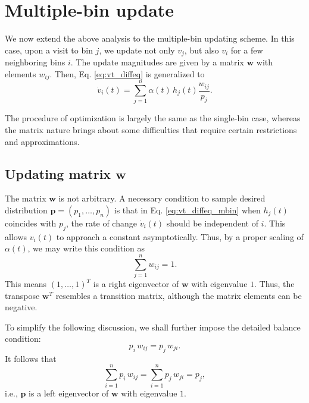 \documentclass[reprint]{revtex4-1}
\begin{document}
\section{\label{sec:multiple-bin}
Multiple-bin update}



We now extend the above analysis to
the multiple-bin updating scheme.
%
In this case,
upon a visit to bin $j$,
we update not only $v_j$,
but also $v_i$ for a few neighboring bins $i$.
%
The update magnitudes are given by a matrix $\mathbf w$
with elements $w_{ij}$.
%
Then, Eq. \eqref{eq:vt_diffeq} is generalized to
\begin{equation}
  \dot v_i(t) =
  \sum_{j=1}^n \alpha(t) \, h_j(t) \frac{ w_{ij} } { p_j }.
  \label{eq:vt_diffeq_mbin}
\end{equation}


The procedure of optimization is largely
the same as the single-bin case,
whereas the matrix nature brings about
some difficulties that require
certain restrictions and approximations.



\subsection{Updating matrix $\mathbf w$}



The matrix $\mathbf w$ is not arbitrary.
%
A necessary condition to sample desired distribution
$\mathbf p = (p_1, \dots, p_n)$
is that in Eq. \eqref{eq:vt_diffeq_mbin}
when $h_j(t)$ coincides with $p_j$,
the rate of change $\dot v_i(t)$
should be independent of $i$.
%
This allows $v_i(t)$ to approach a constant
asymptotically.
%
Thus, by a proper scaling of $\alpha(t)$,
we may write this condition as
%
\begin{equation}
  \sum_{j = 1}^n w_{ij} = 1.
  \label{eq:w_sumj}
\end{equation}
%
This means $(1, \dots, 1)^T$
is a right eigenvector of $\mathbf w$
with eigenvalue $1$.
%
Thus, the transpose $\mathbf w^T$
resembles a transition matrix,
although the matrix elements can be negative.



To simplify the following discussion,
we shall further impose the
detailed balance condition:
%
\begin{equation}
  p_i \, w_{ij} = p_j \, w_{ji}.
  \label{eq:w_detailedbalance}
\end{equation}
%
It follows that
\begin{equation}
  \sum_{i = 1}^n p_i \, w_{ij}
  =
  \sum_{i = 1}^n p_j \, w_{ji}
  = p_j,
  \label{eq:w_balance}
\end{equation}
%
i.e., $\mathbf p$ is a left eigenvector of
$\mathbf w$ with eigenvalue $1$.
\end{document}
